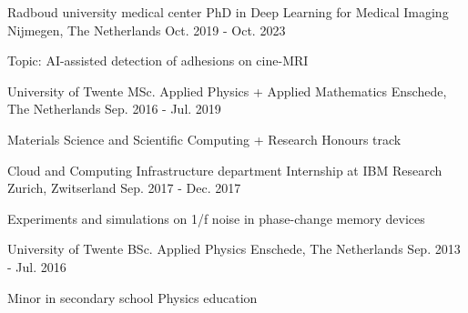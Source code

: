 

\begin{cventries}

  \cventry
    {Radboud university medical center} %
    {PhD in Deep Learning for Medical Imaging} %
    {Nijmegen, The Netherlands} %
    {Oct. 2019 - Oct. 2023} %
    {
      \begin{cvitems} %
        \item {Topic: AI-assisted detection of adhesions on cine-MRI}
      \end{cvitems}
    }

  \cventry
    {University of Twente} %
    {MSc. Applied Physics + Applied Mathematics} %
    {Enschede, The Netherlands} %
    {Sep. 2016 - Jul. 2019} %
    {
      \begin{cvitems} %
        \item {Materials Science and Scientific Computing + Research Honours track}
      \end{cvitems}
    }

  \cventry
    {Cloud and Computing Infrastructure department} %
    {Internship at IBM Research} %
    {Zurich, Zwitserland} %
    {Sep. 2017 - Dec. 2017} %
    {
      \begin{cvitems} %
        \item {Experiments and simulations on 1/f noise in phase-change memory devices}
      \end{cvitems}
    }

  \cventry
    {University of Twente} %
    {BSc. Applied Physics} %
    {Enschede, The Netherlands} %
    {Sep. 2013 - Jul. 2016} %
    {
      \begin{cvitems} %
        \item {Minor in secondary school Physics education}
      \end{cvitems}
    }

\end{cventries}

